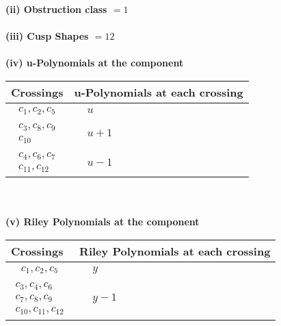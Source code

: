 \documentclass[1p]{elsarticle_modified}
\theoremstyle{definition}
\begin{document}
\flushleft \textbf{(ii) Obstruction class $= 1$}\\~\\
\flushleft \textbf{(iii) Cusp Shapes $= 12$}\\~\\
\newpage\renewcommand{\arraystretch}{1}
\flushleft \textbf{(iv) u-Polynomials at the component}\newline \\
\begin{tabular}{m{50pt}|m{274pt}}
Crossings & \hspace{64pt}u-Polynomials at each crossing \\
\hline $$\begin{aligned}c_{1},c_{2},c_{5}\end{aligned}$$&$\begin{aligned}
&u
\end{aligned}$\\
\hline $$\begin{aligned}c_{3},c_{8},c_{9}\\c_{10}\end{aligned}$$&$\begin{aligned}
&u+1
\end{aligned}$\\
\hline $$\begin{aligned}c_{4},c_{6},c_{7}\\c_{11},c_{12}\end{aligned}$$&$\begin{aligned}
&u-1
\end{aligned}$\\
\hline
\end{tabular}\\~\\
\newpage\renewcommand{\arraystretch}{1}
\flushleft \textbf{(v) Riley Polynomials at the component}\newline \\
\begin{tabular}{m{50pt}|m{274pt}}
Crossings & \hspace{64pt}Riley Polynomials at each crossing \\
\hline $$\begin{aligned}c_{1},c_{2},c_{5}\end{aligned}$$&$\begin{aligned}
&y
\end{aligned}$\\
\hline $$\begin{aligned}c_{3},c_{4},c_{6}\\c_{7},c_{8},c_{9}\\c_{10},c_{11},c_{12}\end{aligned}$$&$\begin{aligned}
&y-1
\end{aligned}$\\
\hline
\end{tabular}\\~\\
\end{document}
